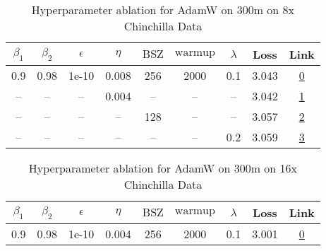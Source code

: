 \begin{table}[H]
\centering
\caption{Hyperparameter ablation for AdamW on 300m on 8x Chinchilla Data}
\label{tab:ablation_adamw_300m_8}
\begin{tabular}{ccccccccc}
\toprule
$\beta_1$ & $\beta_2$ & $\epsilon$ & $\eta$ & $\mathrm{BSZ}$ & $\mathrm{warmup}$ & $\lambda$ & Loss & Link \\
\midrule
0.9 & 0.98 & 1e-10 & 0.008 & 256 & 2000 & 0.1 & 3.043 & \href{https://wandb.ai/stanford-mercury/optimizer-scaling/runs/sweep-300m-48B-adamw07fc6elr0.008-wd0.1-minlr0-warmup2000-b10.9--b38246}{0} \\
\midrule
-- & -- & -- & 0.004 & -- & -- & -- & 3.042 & \href{https://wandb.ai/stanford-mercury/optimizer-scaling/runs/sweep-300m-48B-adamw2537edlr0.004-wd0.1-minlr0-warmup2000-b10.9--a59fd5}{1} \\
-- & -- & -- & -- & 128 & -- & -- & 3.057 & \href{https://wandb.ai/stanford-mercury/optimizer-scaling/runs/sweep-300m-48B-adamw6a50aflr0.008-wd0.1-minlr0-warmup2000-b10.9--22e2a7}{2} \\
-- & -- & -- & -- & -- & -- & 0.2 & 3.059 & \href{https://wandb.ai/stanford-mercury/optimizer-scaling/runs/sweep-300m-48B-adamw7d9e60lr0.008-wd0.2-minlr0-warmup2000-b10.9--dfe5c9}{3} \\
\bottomrule
\end{tabular}
\end{table}

\begin{table}[H]
\centering
\caption{Hyperparameter ablation for AdamW on 300m on 16x Chinchilla Data}
\label{tab:ablation_adamw_300m_16}
\begin{tabular}{ccccccccc}
\toprule
$\beta_1$ & $\beta_2$ & $\epsilon$ & $\eta$ & $\mathrm{BSZ}$ & $\mathrm{warmup}$ & $\lambda$ & Loss & Link \\
\midrule
0.9 & 0.98 & 1e-10 & 0.004 & 256 & 2000 & 0.1 & 3.001 & \href{https://wandb.ai/stanford-mercury/optimizer-scaling/runs/sweep-300m-96B-adamwfcee97lr0.004-wd0.1-minlr0-warmup2000-b10.9--18b705}{0} \\
\midrule
\bottomrule
\end{tabular}
\end{table}

